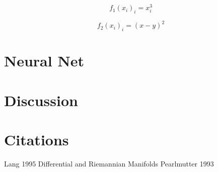 \documentclass{article}
\begin{document}
$$ f_1(x_i)_i = x_i^3 $$


$$ f_2(x_i)_i = (x -y) ^ 2 $$

\section{Neural Net}


\section{Discussion}

\section{Citations}

Lang 1995 Differential and Riemannian Manifolds
Pearlmutter 1993

\end{document}
